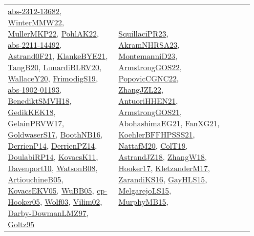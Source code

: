 {\begin{longtable}{llp{6cm}p{6cm}p{6cm}}
\href{articles/abs-2312-13682.pdf}{abs-2312-13682}\cite{abs-2312-13682}, \href{papers/WinterMMW22.pdf}{WinterMMW22}\cite{WinterMMW22}, \href{articles/MullerMKP22.pdf}{MullerMKP22}\cite{MullerMKP22}, \href{articles/PohlAK22.pdf}{PohlAK22}\cite{PohlAK22}, \href{articles/abs-2211-14492.pdf}{abs-2211-14492}\cite{abs-2211-14492}, \href{papers/Astrand0F21.pdf}{Astrand0F21}\cite{Astrand0F21}, \href{papers/KlankeBYE21.pdf}{KlankeBYE21}\cite{KlankeBYE21}, \href{papers/TangB20.pdf}{TangB20}\cite{TangB20}, \href{articles/LunardiBLRV20.pdf}{LunardiBLRV20}\cite{LunardiBLRV20}, \href{articles/WallaceY20.pdf}{WallaceY20}\cite{WallaceY20}, \href{papers/FrimodigS19.pdf}{FrimodigS19}\cite{FrimodigS19}, \href{articles/abs-1902-01193.pdf}{abs-1902-01193}\cite{abs-1902-01193}, \href{papers/BenediktSMVH18.pdf}{BenediktSMVH18}\cite{BenediktSMVH18}, \href{articles/GedikKEK18.pdf}{GedikKEK18}\cite{GedikKEK18}, \href{papers/GelainPRVW17.pdf}{GelainPRVW17}\cite{GelainPRVW17}, \href{papers/GoldwaserS17.pdf}{GoldwaserS17}\cite{GoldwaserS17}, \href{papers/BoothNB16.pdf}{BoothNB16}\cite{BoothNB16}, \href{papers/DerrienP14.pdf}{DerrienP14}\cite{DerrienP14}, \href{papers/DerrienPZ14.pdf}{DerrienPZ14}\cite{DerrienPZ14}, \href{papers/DoulabiRP14.pdf}{DoulabiRP14}\cite{DoulabiRP14}, \href{articles/KovacsK11.pdf}{KovacsK11}\cite{KovacsK11}, \href{papers/Davenport10.pdf}{Davenport10}\cite{Davenport10}, \href{papers/WatsonB08.pdf}{WatsonB08}\cite{WatsonB08}, \href{papers/ArtiouchineB05.pdf}{ArtiouchineB05}\cite{ArtiouchineB05}, \href{papers/KovacsEKV05.pdf}{KovacsEKV05}\cite{KovacsEKV05}, \href{papers/WuBB05.pdf}{WuBB05}\cite{WuBB05}, \href{papers/cp-Hooker05.pdf}{cp-Hooker05}\cite{cp-Hooker05}, \href{papers/Wolf03.pdf}{Wolf03}\cite{Wolf03}, \href{papers/Vilim02.pdf}{Vilim02}\cite{Vilim02}, \href{articles/Darby-DowmanLMZ97.pdf}{Darby-DowmanLMZ97}\cite{Darby-DowmanLMZ97}, \href{papers/Goltz95.pdf}{Goltz95}\cite{Goltz95} & \href{papers/SquillaciPR23.pdf}{SquillaciPR23}\cite{SquillaciPR23}, \href{articles/AkramNHRSA23.pdf}{AkramNHRSA23}\cite{AkramNHRSA23}, \href{articles/MontemanniD23.pdf}{MontemanniD23}\cite{MontemanniD23}, \href{papers/ArmstrongGOS22.pdf}{ArmstrongGOS22}\cite{ArmstrongGOS22}, \href{papers/PopovicCGNC22.pdf}{PopovicCGNC22}\cite{PopovicCGNC22}, \href{papers/ZhangJZL22.pdf}{ZhangJZL22}\cite{ZhangJZL22}, \href{papers/AntuoriHHEN21.pdf}{AntuoriHHEN21}\cite{AntuoriHHEN21}, \href{papers/ArmstrongGOS21.pdf}{ArmstrongGOS21}\cite{ArmstrongGOS21}, \href{articles/AbohashimaEG21.pdf}{AbohashimaEG21}\cite{AbohashimaEG21}, \href{articles/FanXG21.pdf}{FanXG21}\cite{FanXG21}, \href{articles/KoehlerBFFHPSSS21.pdf}{KoehlerBFFHPSSS21}\cite{KoehlerBFFHPSSS21}, \href{papers/NattafM20.pdf}{NattafM20}\cite{NattafM20}, \href{papers/ColT19.pdf}{ColT19}\cite{ColT19}, \href{papers/AstrandJZ18.pdf}{AstrandJZ18}\cite{AstrandJZ18}, \href{articles/ZhangW18.pdf}{ZhangW18}\cite{ZhangW18}, \href{papers/Hooker17.pdf}{Hooker17}\cite{Hooker17}, \href{papers/KletzanderM17.pdf}{KletzanderM17}\cite{KletzanderM17}, \href{articles/ZarandiKS16.pdf}{ZarandiKS16}\cite{ZarandiKS16}, \href{papers/GayHLS15.pdf}{GayHLS15}\cite{GayHLS15}, \href{papers/MelgarejoLS15.pdf}{MelgarejoLS15}\cite{MelgarejoLS15}, \href{papers/MurphyMB15.pdf}{MurphyMB15}\cite{MurphyMB15}, 
\end{longtable}}
